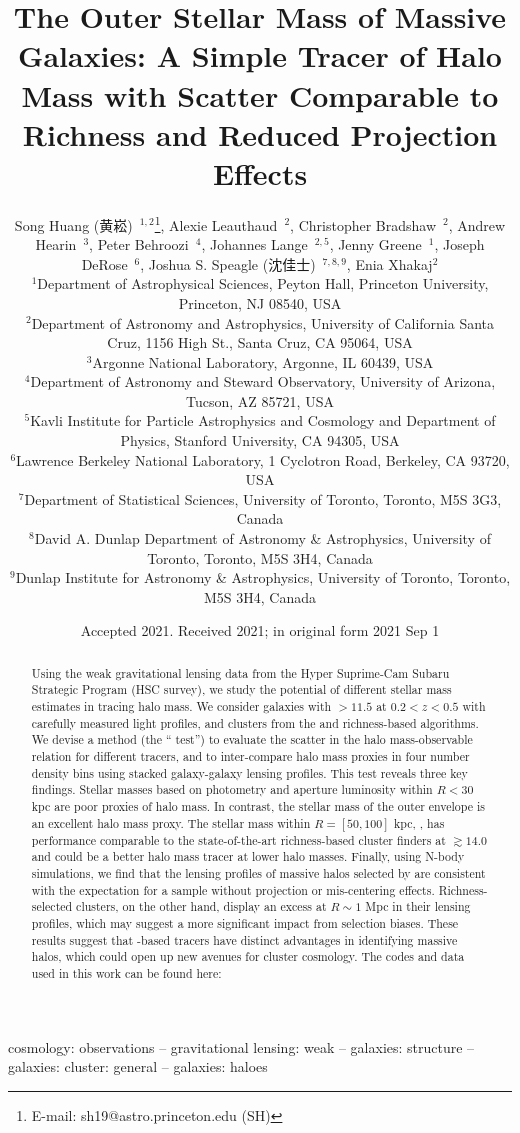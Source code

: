 \documentclass[fleqn,usenatbib,useAMS]{mnras}
\title[Outer Galaxy Mass as a Halo Mass Proxy]{
    The Outer Stellar Mass of Massive Galaxies: A Simple Tracer of Halo Mass with Scatter 
    Comparable to Richness and Reduced Projection Effects}
\author[S. Huang et al.]{
        Song Huang (黄崧)\ \href{https://orcid.org/0000-0003-1385-7591}{\textcolor{orcidlogocol}{\faOrcid}}$^{1,2}$\thanks{E-mail: sh19@astro.princeton.edu (SH)},
        Alexie Leauthaud\ \href{https://orcid.org/0000-0002-3677-3617}{\textcolor{orcidlogocol}{\faOrcid}}$^{2}$,
        Christopher Bradshaw\ \href{https://orcid.org/0000-0003-0833-573X}{\textcolor{orcidlogocol}{\faOrcid}}$^{2}$,
        \newauthor
        Andrew Hearin\ \href{https://orcid.org/0000-0003-2219-6852}{\textcolor{orcidlogocol}{\faOrcid}}$^{3}$,
        Peter Behroozi\ \href{https://orcid.org/0000-0002-2517-6446}{\textcolor{orcidlogocol}{\faOrcid}}$^{4}$,
        Johannes Lange\ \href{https://orcid.org/0000-0002-2450-1366}{\textcolor{orcidlogocol}{\faOrcid}}$^{2, 5}$,
        Jenny Greene\ \href{https://orcid.org/0000-0002-5612-3427}{\textcolor{orcidlogocol}{\faOrcid}}$^{1}$,
        \newauthor
        Joseph DeRose\ \href{https://orcid.org/0000-0002-0728-0960}{\textcolor{orcidlogocol}{\faOrcid}}$^{6}$,
        Joshua S. Speagle (沈佳士)\ \href{https://orcid.org/0000-0002-5065-9896}{\textcolor{orcidlogocol}{\faOrcid}}$^{7, 8, 9}$,
        Enia Xhakaj$^{2}$\\
        $^{1}$Department of Astrophysical Sciences, Peyton Hall,
              Princeton University, Princeton, NJ 08540, USA \\
        $^{2}$Department of Astronomy and Astrophysics, University of California
              Santa Cruz, 1156 High St., Santa Cruz, CA 95064, USA\\
        $^{3}$Argonne National Laboratory, Argonne, IL 60439, USA\\
        $^{4}$Department of Astronomy and Steward Observatory, University of Arizona,
              Tucson, AZ 85721, USA\\
        $^{5}$Kavli Institute for Particle Astrophysics and Cosmology and Department of Physics, 
            Stanford University, CA 94305, USA\\
        $^{6}$Lawrence Berkeley National Laboratory, 1 Cyclotron Road, Berkeley, CA 93720, USA\\
        $^{7}$Department of Statistical Sciences, University of Toronto, Toronto, M5S 3G3, Canada\\
        $^{8}$David A. Dunlap Department of Astronomy \& Astrophysics, University of Toronto, 
            Toronto, M5S 3H4, Canada\\
        $^{9}$Dunlap Institute for Astronomy \& Astrophysics, University of Toronto, 
            Toronto, M5S 3H4, Canada
        }
\date{Accepted 2021. Received 2021; in original form 2021 Sep 1}
\begin{document}
\begin{CJK*}{UTF8}{gbsn}
\label{firstpage}
\pagerange{\pageref{firstpage}--\pageref{lastpage}}

\maketitle

\begin{abstract}
    
    Using the weak gravitational lensing data from the Hyper Suprime-Cam Subaru Strategic Program 
    (HSC survey), we study the potential of different stellar mass estimates in tracing halo mass.
    We consider galaxies with \logms{}$>11.5$ at $0.2 < z < 0.5$ with carefully measured light 
    profiles, and clusters from the \redm{} and \camira{} richness-based algorithms.
    We devise a method (the ``\topn{} test'') to evaluate the scatter in the halo mass-observable
    relation for different tracers, and to inter-compare halo mass proxies in four number density 
    bins using stacked galaxy-galaxy lensing profiles.
    This test reveals three key findings. 
    Stellar masses based on \cmodel{} photometry and aperture luminosity within $R<$30 kpc are 
    poor proxies of halo mass. 
    In contrast, the stellar mass of the outer envelope is an excellent halo mass proxy. 
    The stellar mass within $R=[50,100]$ kpc, , has performance comparable to the
    state-of-the-art richness-based cluster finders at \logmvir{}$\gtrsim 14.0$ and could be a
    better halo mass tracer at lower halo masses. 
    Finally, using N-body simulations, we find that the lensing profiles of massive halos selected
    by  are consistent with the expectation for a sample without projection or
    mis-centering effects. 
    Richness-selected clusters, on the other hand, display an excess at $R\sim 1$ Mpc in their 
    lensing profiles, which may suggest a more significant impact from selection biases.
    These results suggest that \mstar{}-based tracers have distinct advantages in
    identifying massive halos, which could open up new avenues for cluster cosmology.
    The codes and data used in this work can be found here: 
    \href{https://github.com/dr-guangtou/jianbing}{\faGithub}
    

\end{abstract}

\begin{keywords}
    cosmology: observations --
    gravitational lensing: weak --
    galaxies: structure --
    galaxies: cluster: general --
    galaxies: haloes
\end{keywords}




\end{CJK*}
\end{document}
